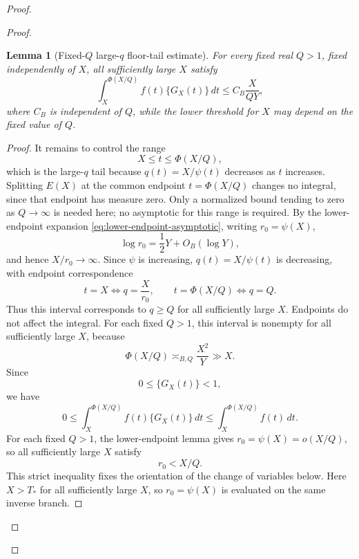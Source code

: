 \documentclass[11pt]{article}
\newtheorem{lemma}{Lemma}
\begin{document}
\begin{proof}
\begin{proof}
\begin{lemma}[Fixed-$Q$ large-$q$ floor-tail estimate]
For every fixed real $Q>1$, fixed independently of $X$, all sufficiently large $X$ satisfy
\[
\int_X^{\Phi(X/Q)} f(t)\{G_X(t)\}\,dt
\le
C_B\frac X{QY},
\tag{39}\label{eq:floor-tail-bound}
\]
where $C_B$ is independent of $Q$, while the lower threshold for $X$ may depend on the fixed
value of $Q$.
\end{lemma}

\begin{proof}
It remains to control the range
\[
X\le t\le\Phi(X/Q),
\]
which is the large-$q$ tail because $q(t)=X/\psi(t)$ decreases as $t$ increases. Splitting
$E(X)$ at the common endpoint
$t=\Phi(X/Q)$ changes no integral, since that endpoint has measure zero. Only a normalized
bound tending to zero as $Q\to\infty$ is
needed here; no asymptotic for this range is required. By the lower-endpoint expansion
\eqref{eq:lower-endpoint-asymptotic}, writing $r_0=\psi(X)$,
\[
\log r_0=\frac12Y+O_B(\log Y),
\]
and hence $X/r_0\to\infty$. Since $\psi$ is increasing, $q(t)=X/\psi(t)$ is decreasing, with
endpoint correspondence
\[
t=X\Longleftrightarrow q=\frac{X}{r_0},
\qquad
 t=\Phi(X/Q)\Longleftrightarrow q=Q.
\]
Thus this interval corresponds to $q\ge Q$ for all sufficiently large $X$. Endpoints do not
affect the integral. For each fixed $Q>1$, this interval is nonempty for all sufficiently large
$X$, because
\[
\Phi(X/Q)\asymp_{B,Q}\frac{X^2}{Y}\gg X.
\]
Since
\[
0\le\{G_X(t)\}<1,
\]
we have
\[
0\le
\int_X^{\Phi(X/Q)} f(t)\{G_X(t)\}\,dt
\le
\int_X^{\Phi(X/Q)} f(t)\,dt.
\]
For each fixed $Q>1$, the lower-endpoint lemma gives $r_0=\psi(X)=o(X/Q)$, so all sufficiently
large $X$ satisfy
\[
r_0<X/Q.
\]
This strict inequality fixes the orientation of the change of variables below. Here $X>T_*$ for
all sufficiently large $X$, so $r_0=\psi(X)$ is evaluated on the same inverse branch.


\end{proof}
\end{proof}
\end{proof}
\end{document}
